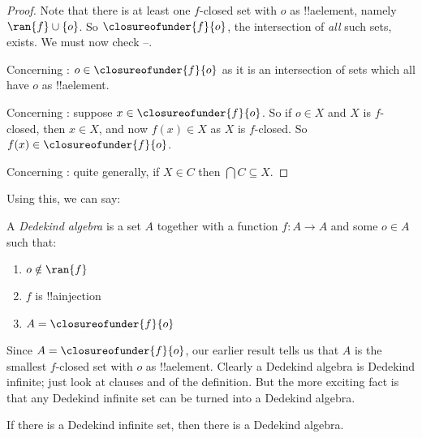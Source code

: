\documentclass[../../../include/open-logic-section]{subfiles}
\begin{document}
\begin{proof}
Note that there is at least one $f$-closed set with $o$ as !!a{element}, namely $\ran{f}\cup
\{o\}$. So $\closureofunder{f}{o}$, the intersection of \emph{all}
such sets, exists. We must now check
--.

Concerning : $o \in \closureofunder{f}{o}$ as it is an
intersection of sets which all have $o$ as !!a{element}. 

Concerning : suppose $x \in \closureofunder{f}{o}$. So if $o \in X$ and $X$ is $f$-closed, then $x \in X$, and now $f(x) \in X$ as $X$ is
$f$-closed. So $f(x) \in \closureofunder{f}{o}$.

Concerning : quite generally, if $X
\in C$ then $\bigcap C \subseteq X$.
\end{proof}

Using this, we can say:

\begin{defn}
A \emph{Dedekind algebra} is a set $A$ together with a function $f
\colon A \to A$ and some $o \in A$  such that:
	\begin{enumerate}
		\item {} $o \notin \ran{f}$
		\item {} $f$ is !!a{injection}
		\item {} $A = \closureofunder{f}{o}$
	\end{enumerate}
\end{defn}

Since $A = \closureofunder{f}{o}$, our earlier result tells us that
$A$ is the smallest $f$-closed set with $o$ as !!a{element}. Clearly a
Dedekind algebra is Dedekind infinite; just look at clauses
 and  of the definition. But
the more exciting fact is that any Dedekind infinite set can be turned
into a Dedekind algebra. 

\begin{thm}
If there is a Dedekind infinite set, then there is a Dedekind algebra.
\end{thm}
\end{document}
